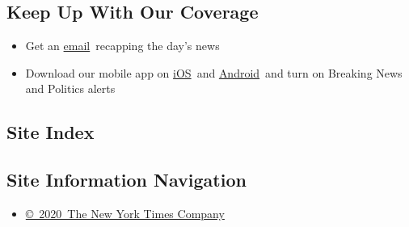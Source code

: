 \begin{itemize}
{  \subsection{Keep Up With Our
  Coverage}\label{keep-up-with-our-coverage}}

  \begin{itemize}
  \item
    Get an
    \href{https://www.nytimes3xbfgragh.onion/newsletters/politics?action=click\&pgtype=Article\&state=default\&region=BELOW_MAIN_CONTENT\&context=storylines_guide}{email}~recapping
    the day's news
  \item
    Download our mobile app on
    \href{https://apps.apple.com/us/app/nytimes/id284862083?ls=1\&mat_click_id=5c79ae7455014fd1bd66b5610c05b8f2-20191112-16948\&referrer=mat_click_id\%3D5c79ae7455014fd1bd66b5610c05b8f2-20191112-16948\%26link_click_id\%3D722930677036718082}{iOS}~and
    \href{http://a.localytics.com/android?id=com.nytimes.android\&referrer=utm_source\%3Dother_nyt_mobile_web\%26utm_medium\%3DWeb\%2520page\%26utm_term\%3DGeneral\%2520Mobile\%2520Page\%26utm_campaign\%3DNYT\%2520Mobile\%2520General\%2520Page}{Android}~and
    turn on Breaking News and Politics alerts
  \end{itemize}
\end{itemize}

\hypertarget{site-index}{%
\subsection{Site Index}\label{site-index}}

\hypertarget{site-information-navigation}{%
\subsection{Site Information
Navigation}\label{site-information-navigation}}

\begin{itemize}
\tightlist
\item
  \href{https://help.nytimes3xbfgragh.onion/hc/en-us/articles/115014792127-Copyright-notice}{©~2020~The
  New York Times Company}
\end{itemize}

